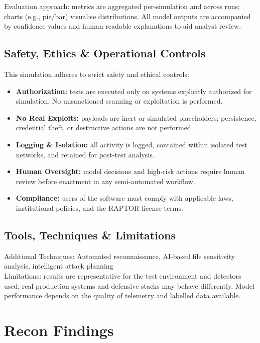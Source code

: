 \documentclass[a4paper,12pt]{article}
\begin{document}
Evaluation approach: metrics are aggregated per-simulation and across runs; charts (e.g., pie/bar) visualise distributions. All model outputs are accompanied by confidence values and human-readable explanations to aid analyst review.

\subsection*{Safety, Ethics \& Operational Controls}
This simulation adheres to strict safety and ethical controls:
\begin{itemize}
    \item \textbf{Authorization:} tests are executed only on systems explicitly authorized for simulation. No unsanctioned scanning or exploitation is performed.
    \item \textbf{No Real Exploits:} payloads are inert or simulated placeholders; persistence, credential theft, or destructive actions are not performed.
    \item \textbf{Logging \& Isolation:} all activity is logged, contained within isolated test networks, and retained for post‑test analysis.
    \item \textbf{Human Oversight:} model decisions and high‑risk actions require human review before enactment in any semi-automated workflow.
    \item \textbf{Compliance:} users of the software must comply with applicable laws, institutional policies, and the RAPTOR license terms.
\end{itemize}

\subsection*{Tools, Techniques \& Limitations}
Additional Techniques: Automated reconnaissance, AI-based file sensitivity analysis, intelligent attack planning \\[0.2cm]
Limitations: results are representative for the test environment and detectors used; real production systems and defensive stacks may behave differently. Model performance depends on the quality of telemetry and labelled data available.

\newpage


\section*{Recon Findings}
\end{document}
